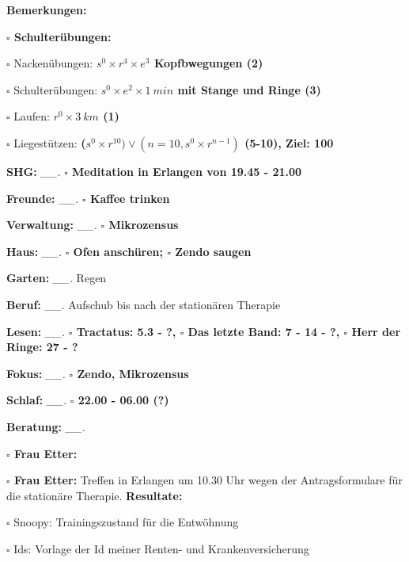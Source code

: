 \documentclass[10pt,a4paper]{article}
\newcommand\prop[1] {{\color {alizarin} {\bf #1}}}        %
\newcommand\opti[1] {{\color {amethyst} {\bf #1}}}        %
\newcommand\mand[1] {{\color {burntorange} {\bf #1}}}     %
\newcommand\topspace{\vskip -15pt \hskip 20pt}
\newcommand\bottomspace{\vskip 4pt}
\newcommand\n[1] { {\sl #1.} \hskip 5pt }
\begin{document}
\begin{mdframed}[style=daystyle]
\begin{labeling}{{\mand {Bemerkungen:}}}
\begin{minipage}{0.75\textwidth}
\begin{labeling}{\prop {$\square$ {Schulterübungen:}}}
        \setlength\itemsep{-3pt}
      \item[$\square$ Nackenübungen:]   {\prop {$s^0 \times r^4 \times e^3$ Kopfbwegungen (2)}}
      \item[$\square$ Schulterübungen:] {\prop {$s^0 \times e^2 \times 1\ min$ mit Stange und Ringe (3)}}
      \item[$\square$ Laufen:]          {\prop {$r^0 \times 3\ km$ (1)}}
      \item[$\square$ Liegestützen:]    {\prop {($s^0 \times r^{10}) \vee (n=10, s^0 \times r^{n-1})$ (5-10), Ziel: 100}}
      \end{labeling}
    \end{minipage}
    \bottomspace        
  \item[{\mand {SHG:}}]          \n{\_\_} {\prop {$\square$ Meditation in Erlangen von 19.45 - 21.00}}
  \item[{\mand {Freunde:}}]      \n{\_\_} {\prop {$\square$ Kaffee trinken}}
  \item[{\mand {Verwaltung:}}]   \n{\_\_} {\prop {$\square$ Mikrozensus}}
  \item[{\mand {Haus:}}]         \n{\_\_} {\prop {$\square$ Ofen anschüren; $\square$ Zendo saugen}}
  \item[{\mand {Garten:}}]       \n{\_\_} Regen
  \item[{\mand {Beruf:}}]        \n{\_\_} Aufschub bis nach der stationären Therapie
  \item[{\mand {Lesen:}}]        \n{\_\_} {\prop {$\square$ Tractatus: 5.3 - ?,
      $\square$ Das letzte Band: 7 - 14 - ?, $\square$ Herr der Ringe: 27 - ?}}
  \item[{\mand {Fokus:}}]        \n{\_\_} {\prop {$\square$ Zendo, Mikrozensus}}
  \item[{\mand {Schlaf:}}]       \n{\_\_} {\prop {$\square$ 22.00 - 06.00 (?)}}
  \item[{\opti {Beratung:}}]     \n{\_\_} 
    \topspace
    \begin{minipage}{0.75\textwidth}  
      \begin{labeling}{\prop {$\square$ Frau Etter:}}
        \setlength\itemsep{-3pt}
      \item[{\prop {$\square$ Frau Etter:}}] Treffen in Erlangen um 10.30 Uhr wegen der
        Antragsformulare für die stationäre Therapie. {\bf Resultate:}
      \item[$\square$ Snoopy:]     Trainingszustand für die Entwöhnung
      \item[$\square$ Ids:]        Vorlage der Id meiner Renten- und Krankenversicherung

\end{labeling}
\end{minipage}
\end{labeling}
\end{mdframed}
\end{document}
